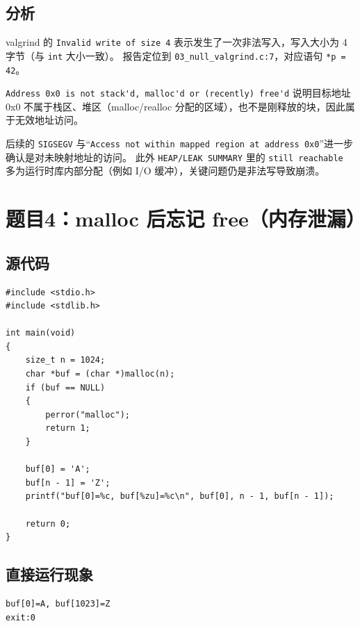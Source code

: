 \documentclass[fleqn]{ctexart}
\begin{document}
\subsection*{分析}
valgrind 的 \verb|Invalid write of size 4| 表示发生了一次非法写入，写入大小为 4 字节（与 \verb|int| 大小一致）。
报告定位到 \verb|03_null_valgrind.c:7|，对应语句 \verb|*p = 42|。

\verb|Address 0x0 is not stack'd, malloc'd or (recently) free'd| 说明目标地址 0x0 不属于栈区、堆区（malloc/realloc 分配的区域），也不是刚释放的块，因此属于无效地址访问。

后续的 \verb|SIGSEGV| 与“\verb|Access not within mapped region at address 0x0|”进一步确认是对未映射地址的访问。
此外 \verb|HEAP/LEAK SUMMARY| 里的 \verb|still reachable| 多为运行时库内部分配（例如 I/O 缓冲），关键问题仍是非法写导致崩溃。


\section*{题目4：malloc 后忘记 free（内存泄漏）}
\subsection*{源代码}
\begin{verbatim}
#include <stdio.h>
#include <stdlib.h>

int main(void)
{
	size_t n = 1024;
	char *buf = (char *)malloc(n);
	if (buf == NULL)
	{
		perror("malloc");
		return 1;
	}

	buf[0] = 'A';
	buf[n - 1] = 'Z';
	printf("buf[0]=%c, buf[%zu]=%c\n", buf[0], n - 1, buf[n - 1]);

	return 0;
}
\end{verbatim}

\subsection*{直接运行现象}
\begin{verbatim}
buf[0]=A, buf[1023]=Z
exit:0
\end{verbatim}
\end{document}
